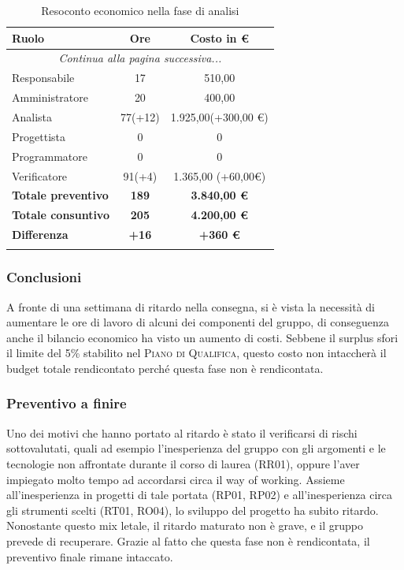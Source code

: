 \documentclass[../piano_di_progetto.tex]{subfiles}
\begin{document}
\begin{center}
	\begin{longtable}{|l|c|c|}
		\hline
		\rowcolor{lightgray}
		\textbf{Ruolo} & \textbf{Ore} & \textbf{Costo in €}\\
		\hline
		\endhead
		
		\hline
		\multicolumn{3}{|c|}{\emph{Continua alla pagina successiva...}}\\
		\hline
		\endfoot

		\endlastfoot
		Responsabile & 17 & 510,00 \\
		Amministratore & 20 & 400,00 \\
		Analista & 77(+12) & 1.925,00(+300,00 €) \\
		Progettista &    0       & 0 \\
		Programmatore &  0       & 0 \\
		Verificatore &   91(+4)      & 1.365,00 (+60,00€) \\
		\hline
		\textbf{Totale preventivo} & \textbf{189} & \textbf{3.840,00 €} \\
		\hline
		\textbf{Totale consuntivo} & \textbf{205	} & \textbf{4.200,00 €} \\
		\hline
		\textbf{Differenza} & \textbf{+16} & \textbf{+360 €}\\
		\hline
		\rowcolor{white}
		\caption{Resoconto economico nella fase di analisi}
	\end{longtable}
\end{center}

\subsubsection{Conclusioni}%
\label{sub:cons_con_1}
A fronte di una settimana di ritardo nella consegna, si è vista la necessità di aumentare le ore di lavoro di alcuni dei componenti del gruppo, di conseguenza anche il bilancio economico ha visto un aumento di costi. Sebbene il surplus sfori il limite del 5\% stabilito nel \textsc{Piano di Qualifica}, questo costo non intaccherà il budget totale rendicontato perché questa fase non è rendicontata.

\subsubsection{Preventivo a finire}
\label{sub:cons_prev_fine_1}
Uno dei motivi che hanno portato al ritardo è stato il verificarsi di rischi sottovalutati, quali ad esempio l'inesperienza del gruppo con gli argomenti e le tecnologie non affrontate durante il corso di laurea (RR01), oppure l'aver impiegato molto tempo ad accordarsi circa il way of working. Assieme all'inesperienza in progetti di tale portata (RP01, RP02) e all'inesperienza circa gli strumenti scelti (RT01, RO04), lo sviluppo del progetto ha subito ritardo. Nonostante questo mix letale, il ritardo maturato non è grave, e il gruppo prevede di recuperare.
Grazie al fatto che questa fase non è rendicontata, il preventivo finale rimane intaccato. \\ \\
\end{document}
